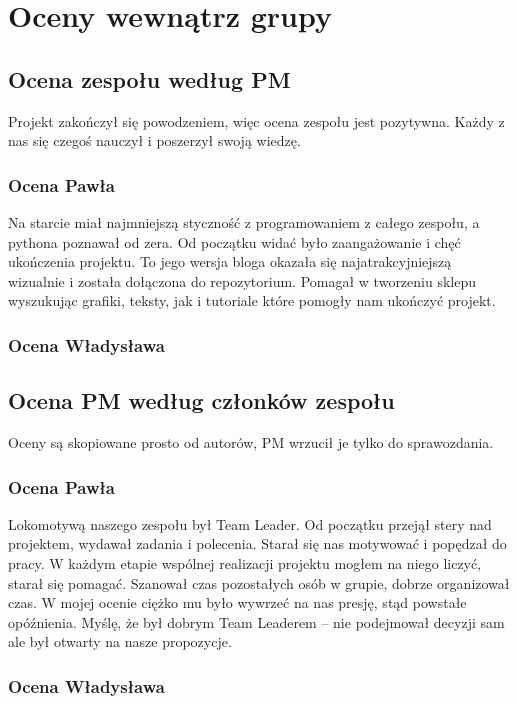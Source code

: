 \documentclass{article}
\begin{document}
\newpage
\section{Oceny wewnątrz grupy}
\subsection{Ocena zespołu według PM}
\par Projekt zakończył się powodzeniem, więc ocena zespołu jest pozytywna. Każdy z nas się czegoś nauczył i poszerzył swoją wiedzę.
\subsubsection{Ocena Pawła} \par Na starcie miał najmniejszą styczność z programowaniem z całego zespołu, a pythona poznawał od zera. Od początku widać było zaangażowanie i chęć ukończenia projektu. To jego wersja bloga okazała się najatrakcyjniejszą wizualnie i została dołączona do repozytorium. Pomagał w tworzeniu sklepu wyszukując grafiki, teksty, jak i tutoriale które pomogły nam ukończyć projekt.
\subsubsection{Ocena Władysława}
\newpage
\subsection{Ocena PM według członków zespołu}
Oceny są skopiowane prosto od autorów, PM wrzucił je tylko do sprawozdania.
\subsubsection{Ocena Pawła}
\par Lokomotywą naszego zespołu był Team Leader. Od początku przejął stery nad projektem, wydawał zadania i polecenia. Starał się nas motywować i popędzał do pracy. W każdym etapie wspólnej realizacji projektu mogłem na niego liczyć, starał się pomagać. Szanował czas pozostałych osób w grupie, dobrze organizował czas. W mojej ocenie ciężko mu było wywrzeć na nas presję, stąd powstałe opóźnienia. Myślę, że był dobrym Team Leaderem – nie podejmował decyzji sam ale był otwarty na nasze propozycje.
\subsubsection{Ocena Władysława}
\end{document}

